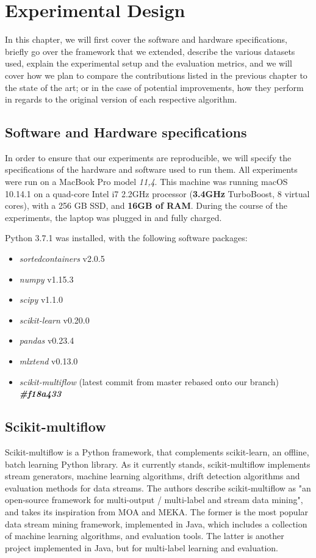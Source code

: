 
\chapter{Experimental Design\label{chapter:experimental_design}} %
In this chapter, we will first cover the software and hardware specifications, briefly go over the framework that we extended, describe the various datasets used, explain the experimental setup and the evaluation metrics, and we will cover how we plan to compare the contributions listed in the previous chapter to the state of the art; or in the case of potential improvements, how they perform in regards to the original version of each respective algorithm.


\section{Software and Hardware specifications}
In order to ensure that our experiments are reproducible, we will specify the specifications of the hardware and software used to run them. All experiments were run on a MacBook Pro model \textit{11,4}. This machine was running macOS 10.14.1 on a quad-core Intel i7 2.2GHz processor (\textbf{3.4GHz} TurboBoost, 8 virtual cores), with a 256 GB SSD, and \textbf{16GB of RAM}. During the course of the experiments, the laptop was plugged in and fully charged.

Python 3.7.1 was installed, with the following software packages:
\begin{itemize}
\item \textit{sortedcontainers} v2.0.5
\item \textit{numpy} v1.15.3
\item \textit{scipy} v1.1.0
\item \textit{scikit-learn} v0.20.0
\item \textit{pandas} v0.23.4
\item \textit{mlxtend} v0.13.0
\item \textit{scikit-multiflow} (latest commit from master rebased onto our branch) \textit{\textbf{\#f18a433}}
\end{itemize}

\section{Scikit-multiflow}
Scikit-multiflow \cite{skmultiflow} is a Python framework, that complements scikit-learn, an offline, batch learning Python library. As it currently stands, scikit-multiflow implements stream generators, machine learning algorithms, drift detection algorithms and evaluation methods for data streams. The authors describe scikit-multiflow as "an open-source framework for multi-output / multi-label and stream data mining", and takes its inspiration from MOA and MEKA. The former is the most popular data stream mining framework, implemented in Java, which includes a collection of machine learning algorithms, and evaluation tools. The latter is another project implemented in Java, but for multi-label learning and evaluation.


